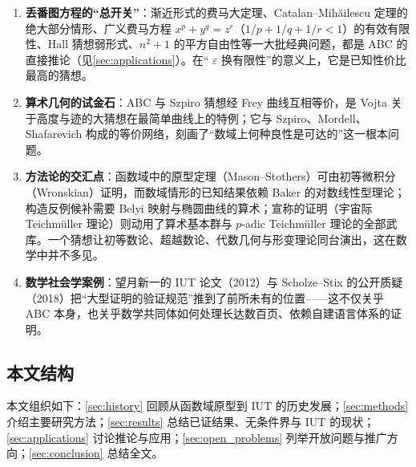 \begin{enumerate}[label=(\arabic*)]
    \item \textbf{丢番图方程的“总开关”}：渐近形式的费马大定理、Catalan--Mih\u{a}ilescu 定理的绝大部分情形、广义费马方程 $x^p + y^q = z^r$（$1/p + 1/q + 1/r < 1$）的有效有限性、Hall 猜想弱形式、$n^2+1$ 的平方自由性等一大批经典问题，都是 ABC 的直接推论（见\cref{sec:applications}）。在“ $\varepsilon$ 换有限性”的意义上，它是已知性价比最高的猜想。
    \item \textbf{算术几何的试金石}：ABC 与 Szpiro 猜想经 Frey 曲线互相等价，是 Vojta 关于高度与迹的大猜想在最简单曲线上的特例；它与 Szpiro、Mordell、Shafarevich 构成的等价网络，刻画了“数域上何种良性是可达的”这一根本问题。
    \item \textbf{方法论的交汇点}：函数域中的原型定理（Mason--Stothers）可由初等微积分（Wronskian）证明，而数域情形的已知结果依赖 Baker 的对数线性型理论；构造反例候补需要 Belyi 映射与椭圆曲线的算术；宣称的证明（宇宙际 Teichm\"uller 理论）则动用了算术基本群与 $p$-adic Teichm\"uller 理论的全部武库。一个猜想让初等数论、超越数论、代数几何与形变理论同台演出，这在数学中并不多见。
    \item \textbf{数学社会学案例}：望月新一的 IUT 论文（2012）与 Scholze--Stix 的公开质疑（2018）把“大型证明的验证规范”推到了前所未有的位置——这不仅关乎 ABC 本身，也关乎数学共同体如何处理长达数百页、依赖自建语言体系的证明。
\end{enumerate}

\subsection{本文结构}

本文组织如下：\cref{sec:history} 回顾从函数域原型到 IUT 的历史发展；\cref{sec:methods} 介绍主要研究方法；\cref{sec:results} 总结已证结果、无条件界与 IUT 的现状；\cref{sec:applications} 讨论推论与应用；\cref{sec:open_problems} 列举开放问题与推广方向；\cref{sec:conclusion} 总结全文。
